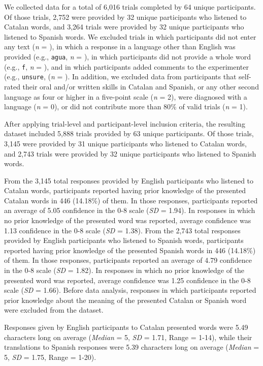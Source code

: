 \documentclass[
]{article}
\begin{document}
We collected data for a total of 6,016 trials completed by 64 unique
participants. Of those trials, 2,752 were provided by 32 unique
participants who listened to Catalan words, and 3,264 trials were
provided by 32 unique participants who listened to Spanish words. We
excluded trials in which participants did not enter any text (\emph{n} =
), in which a response in a language other than English was provided
(e.g., \texttt{agua}, \emph{n} = ), in which participants did not
provide a whole word (e.g., \texttt{f}, \emph{n} = ), and in which
participants added comments to the experimenter (e.g., \texttt{unsure},
(\emph{n} = ). In addition, we excluded data from participants that
self-rated their oral and/or written skills in Catalan and Spanish, or
any other second language as four or higher in a five-point scale
(\emph{n} = 2), were diagnosed with a language (\emph{n} = 0), or did
not contribute more than 80\% of valid trials (\emph{n} = 1).

After applying trial-level and participant-level inclusion criteria, the
resulting dataset included 5,888 trials provided by 63 unique
participants. Of those trials, 3,145 were provided by 31 unique
participants who listened to Catalan words, and 2,743 trials were
provided by 32 unique participants who listened to Spanish words.

From the 3,145 total responses provided by English participants who
listened to Catalan words, participants reported having prior knowledge
of the presented Catalan words in 446 (14.18\%) of them. In those
responses, participants reported an average of 5.05 confidence in the
0-8 scale (\emph{SD} = 1.94). In responses in which no prior knowledge
of the presented word was reported, average confidence was 1.13
confidence in the 0-8 scale (\emph{SD} = 1.38). From the 2,743 total
responses provided by English participants who listened to Spanish
words, participants reported having prior knowledge of the presented
Spanish words in 446 (14.18\%) of them. In those responses, participants
reported an average of 4.79 confidence in the 0-8 scale (\emph{SD} =
1.82). In responses in which no prior knowledge of the presented word
was reported, average confidence was 1.25 confidence in the 0-8 scale
(\emph{SD} = 1.66). Before data analysis, responses in which
participants reported prior knowledge about the meaning of the presented
Catalan or Spanish word were excluded from the dataset.

Responses given by English participants to Catalan presented words were
5.49 characters long on average (\emph{Median} = 5, \emph{SD} = 1.71,
Range = 1-14), while their translations to Spanish responses were 5.39
characters long on average (\emph{Median} = 5, \emph{SD} = 1.75, Range =
1-20).
\end{document}
